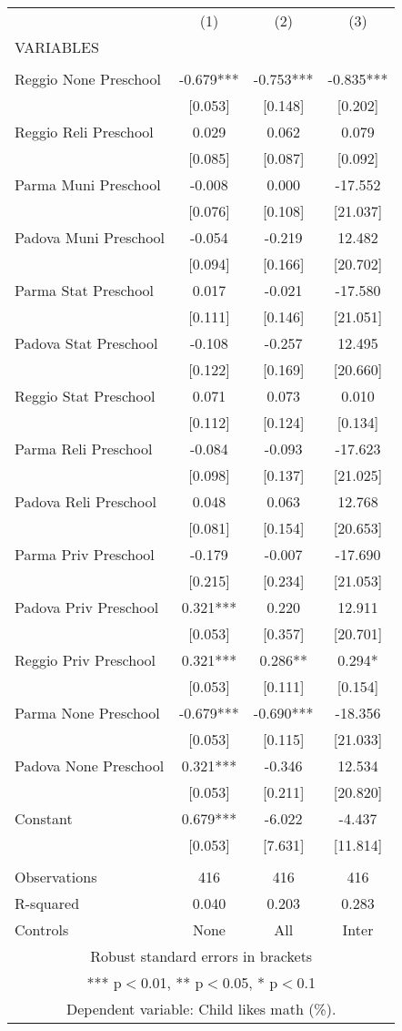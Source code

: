 \begin{tabular}{lccc} \hline
 & (1) & (2) & (3) \\
VARIABLES &  &  &  \\ \hline
 &  &  &  \\
Reggio None Preschool & -0.679*** & -0.753*** & -0.835*** \\
 & [0.053] & [0.148] & [0.202] \\
Reggio Reli Preschool & 0.029 & 0.062 & 0.079 \\
 & [0.085] & [0.087] & [0.092] \\
Parma Muni Preschool & -0.008 & 0.000 & -17.552 \\
 & [0.076] & [0.108] & [21.037] \\
Padova Muni Preschool & -0.054 & -0.219 & 12.482 \\
 & [0.094] & [0.166] & [20.702] \\
Parma Stat Preschool & 0.017 & -0.021 & -17.580 \\
 & [0.111] & [0.146] & [21.051] \\
Padova Stat Preschool & -0.108 & -0.257 & 12.495 \\
 & [0.122] & [0.169] & [20.660] \\
Reggio Stat Preschool & 0.071 & 0.073 & 0.010 \\
 & [0.112] & [0.124] & [0.134] \\
Parma Reli Preschool & -0.084 & -0.093 & -17.623 \\
 & [0.098] & [0.137] & [21.025] \\
Padova Reli Preschool & 0.048 & 0.063 & 12.768 \\
 & [0.081] & [0.154] & [20.653] \\
Parma Priv Preschool & -0.179 & -0.007 & -17.690 \\
 & [0.215] & [0.234] & [21.053] \\
Padova Priv Preschool & 0.321*** & 0.220 & 12.911 \\
 & [0.053] & [0.357] & [20.701] \\
Reggio Priv Preschool & 0.321*** & 0.286** & 0.294* \\
 & [0.053] & [0.111] & [0.154] \\
Parma None Preschool & -0.679*** & -0.690*** & -18.356 \\
 & [0.053] & [0.115] & [21.033] \\
Padova None Preschool & 0.321*** & -0.346 & 12.534 \\
 & [0.053] & [0.211] & [20.820] \\
Constant & 0.679*** & -6.022 & -4.437 \\
 & [0.053] & [7.631] & [11.814] \\
 &  &  &  \\
Observations & 416 & 416 & 416 \\
R-squared & 0.040 & 0.203 & 0.283 \\
 Controls & None & All & Inter \\ \hline
\multicolumn{4}{c}{ Robust standard errors in brackets} \\
\multicolumn{4}{c}{ *** p$<$0.01, ** p$<$0.05, * p$<$0.1} \\
\multicolumn{4}{c}{ Dependent variable: Child likes math (\%).} \\
\end{tabular}

